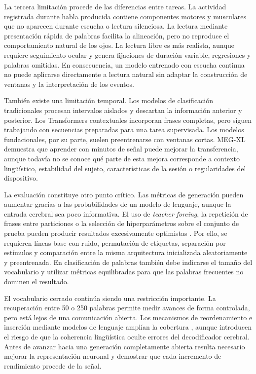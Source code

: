 La tercera limitación procede de las diferencias entre tareas. La actividad registrada durante habla producida contiene componentes motores y musculares que no aparecen durante escucha o lectura silenciosa. La lectura mediante presentación rápida de palabras facilita la alineación, pero no reproduce el comportamiento natural de los ojos. La lectura libre es más realista, aunque requiere seguimiento ocular y genera fijaciones de duración variable, regresiones y palabras omitidas. En consecuencia, un modelo entrenado con escucha continua no puede aplicarse directamente a lectura natural sin adaptar la construcción de ventanas y la interpretación de los eventos.

También existe una limitación temporal. Los modelos de clasificación tradicionales procesan intervalos aislados y descartan la información anterior y posterior. Los Transformers contextuales incorporan frases completas, pero siguen trabajando con secuencias preparadas para una tarea supervisada. Los modelos fundacionales, por su parte, suelen preentrenarse con ventanas cortas. MEG-XL demuestra que aprender con minutos de señal puede mejorar la transferencia, aunque todavía no se conoce qué parte de esta mejora corresponde a contexto lingüístico, estabilidad del sujeto, características de la sesión o regularidades del dispositivo.

La evaluación constituye otro punto crítico. Las métricas de generación pueden aumentar gracias a las probabilidades de un modelo de lenguaje, aunque la entrada cerebral sea poco informativa. El uso de \textit{teacher forcing}, la repetición de frases entre particiones o la selección de hiperparámetros sobre el conjunto de prueba pueden producir resultados excesivamente optimistas \cite{jo2024eegtext}. Por ello, se requieren líneas base con ruido, permutación de etiquetas, separación por estímulos y comparación entre la misma arquitectura inicializada aleatoriamente y preentrenada. En clasificación de palabras también debe indicarse el tamaño del vocabulario y utilizar métricas equilibradas para que las palabras frecuentes no dominen el resultado.

El vocabulario cerrado continúa siendo una restricción importante. La recuperación entre 50 o 250 palabras permite medir avances de forma controlada, pero está lejos de una comunicación abierta. Los mecanismos de reordenamiento e inserción mediante modelos de lenguaje amplían la cobertura \cite{jayalath2025unlocking}, aunque introducen el riesgo de que la coherencia lingüística oculte errores del decodificador cerebral. Antes de avanzar hacia una generación completamente abierta resulta necesario mejorar la representación neuronal y demostrar que cada incremento de rendimiento procede de la señal.


